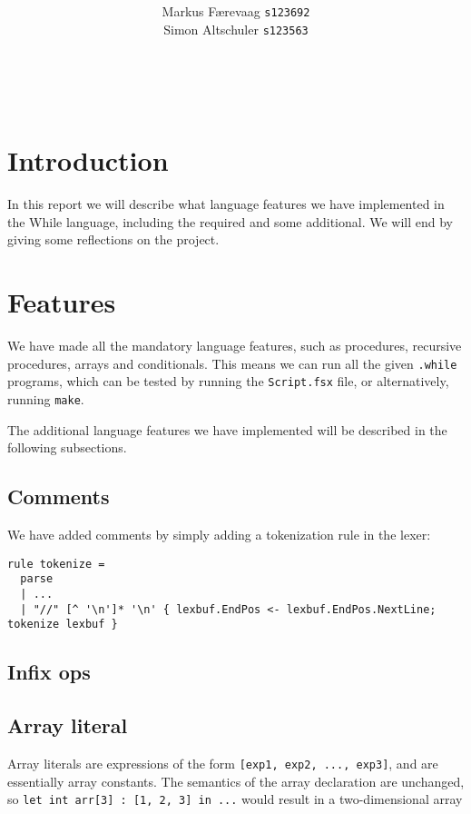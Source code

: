 \documentclass{article}
\title{\TITLE\\ {\large \COURSE}}
\date{\DATE}
\author{
  Markus Færevaag {\tt s123692}\\
  Simon Altschuler {\tt s123563}
}
\begin{document}
\maketitle
\vspace{10cm}
 \\
\clearpage


\section{Introduction}
In this report we will describe what language features we have
implemented in the While language, including the required and some
additional. We will end by giving some reflections on the
project.


\section{Features}
We have made all the mandatory language features, such as procedures,
recursive procedures, arrays and conditionals. This means we can run
all the given {\tt .while} programs, which can be tested by running
the {\tt Script.fsx} file, or alternatively, running {\tt make}.

The additional language features we have implemented will be described
in the following subsections.

\subsection{Comments}
We have added comments by simply adding a tokenization rule in the
lexer:
\begin{verbatim}
rule tokenize =
  parse
  | ...
  | "//" [^ '\n']* '\n' { lexbuf.EndPos <- lexbuf.EndPos.NextLine; tokenize lexbuf }
\end{verbatim}

\subsection{Infix ops}
\subsection{Array literal}
Array literals are expressions of the form {\tt [exp1, exp2, ..., exp3]}, and are essentially array constants. The semantics of the array declaration are unchanged, so {\tt let int arr[3] : [1, 2, 3] in ...} would result in a two-dimensional array
\end{document}
